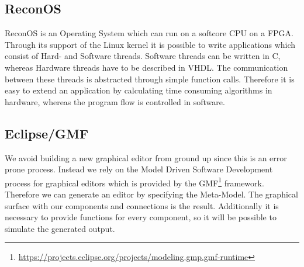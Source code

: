 	  \subsection{ReconOS}
		ReconOS is an Operating System which can run on a softcore CPU on a \ac{FPGA}. Through its support of the Linux kernel it is possible to write applications which consist of Hard- and Software threads. Software threads can be written in C, whereas Hardware threads have to be described in \ac{VHDL}. The communication between these threads is abstracted through simple function calls. Therefore it is easy to extend an application by calculating time consuming algorithms in hardware, whereas the program flow is controlled in software.

	  \subsection{Eclipse/GMF}
		We avoid building a new graphical editor from ground up since this is an error prone process. Instead we rely on the Model Driven Software Development process for graphical editors which is provided by the \ac{GMF}\footnote{\url{https://projects.eclipse.org/projects/modeling.gmp.gmf-runtime}} framework. Therefore we can generate an editor by specifying the Meta-Model. The graphical surface with our components and connections is the result. Additionally it is necessary to provide functions for every component, so it will be possible to simulate the generated output.      